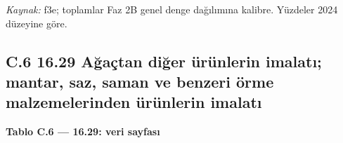 \endgroup

\emph{Kaynak:} \etiketT{} f3e; toplamlar Faz 2B genel denge dağılımına kalibre. Yüzdeler 2024 düzeyine göre.

\hypertarget{nace_kartlar_16-18-c6-1629-aux11fauxe7tan-diux11fer-uxfcruxfcnlerin-imalatux131-mantar-saz-saman-ve-benzeri-uxf6rme-malzemelerinden-uxfcruxfcnlerin-imalatux131}{%
\subsection{C.6 16.29 Ağaçtan diğer ürünlerin imalatı; mantar, saz, saman ve benzeri örme malzemelerinden ürünlerin imalatı}\label{nace_kartlar_16-18-c6-1629-aux11fauxe7tan-diux11fer-uxfcruxfcnlerin-imalatux131-mantar-saz-saman-ve-benzeri-uxf6rme-malzemelerinden-uxfcruxfcnlerin-imalatux131}}


\textbf{Tablo C.6 --- 16.29: veri sayfası}

\nopagebreak[4]

\begingroup\gbtablo\small

